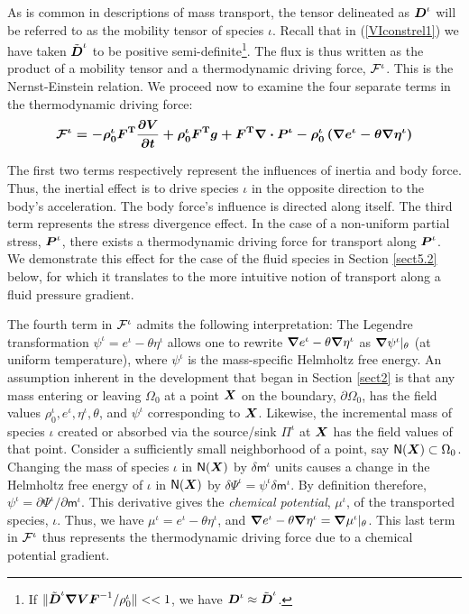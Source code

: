 As is common in descriptions of mass transport, the tensor
delineated as $\mbox{\boldmath$ D$}^\iota$ will be referred to as the mobility
tensor of species $\iota$. Recall that in (\ref{VIconstrel1}) we
have taken $\tilde{\mbox{\boldmath$ D$}}^\iota$ to be positive
semi-definite\footnote{If
$\Vert\tilde{\mbox{\boldmath$ D$}}^\iota\mbox{\boldmath$\nabla$}\mbox{\boldmath$ V$}\mbox{\boldmath$ F$}^{-1}/\rho^\iota_0\Vert << 1$,
we have $\mbox{\boldmath$ D$}^\iota \approx \tilde{\mbox{\boldmath$ D$}}^\iota$.}. The flux is thus
written as the product of a mobility tensor and a thermodynamic
driving force, $\boldmath{{\mathcal F}}^\iota$. This is the Nernst-Einstein
relation. We proceed now to examine the four separate terms in the
thermodynamic driving force:
\begin{equation}
\boldmath{{\mathcal F}}^\iota =
-\rho^\iota_0\mbox{\boldmath$ F$}^\mathrm{T}\frac{\partial\mbox{\boldmath$ V$}}{\partial t} +
\rho_0^\iota\mbox{\boldmath$ F$}^\mathrm{T}\mbox{\boldmath$ g$} +
\mbox{\boldmath$ F$}^\mathrm{T}\mbox{\boldmath$\nabla$}\cdot\mbox{\boldmath$ P$}^\iota - \rho^\iota_0\left(\mbox{\boldmath$\nabla$}
e^\iota - \theta\mbox{\boldmath$\nabla$}\eta^\iota\right) \label{drivingforceI}
\end{equation}

\noindent The first two terms respectively represent the
influences of inertia and body force. Thus, the inertial effect is
to drive species $\iota$ in the opposite direction to the body's
acceleration. The body force's influence is directed along itself.
The third term represents the stress divergence effect. In the
case of a non-uniform partial stress, $\mbox{\boldmath$ P$}^\iota$, there exists a
thermodynamic driving force for transport along $\mbox{\boldmath$ P$}^\iota$. We
demonstrate this effect for the case of the fluid species in
Section \ref{sect5.2} below, for which it translates to the more
intuitive notion of transport along a fluid pressure gradient.

The fourth term in $\boldmath{{\mathcal F}}^\iota$ admits the following
interpretation: The Legendre transformation $\psi^\iota = e^\iota
- \theta\eta^\iota$ allows one to rewrite $\mbox{\boldmath$\nabla$} e^\iota -
\theta\mbox{\boldmath$\nabla$}\eta^\iota$ as $\mbox{\boldmath$\nabla$}\psi^\iota\vert_\theta$ (at
uniform temperature), where $\psi^\iota$ is the mass-specific
Helmholtz free energy. An assumption inherent in the development
that began in Section \ref{sect2} is that any mass entering or
leaving $\Omega_0$ at a point $\mbox{\boldmath$ X$}$ on the boundary,
$\partial\Omega_0$, has the field values
$\rho_0^\iota,e^\iota,\eta^\iota,\theta$, and $\psi^\iota$
corresponding to $\mbox{\boldmath$ X$}$. Likewise, the incremental mass of species
$\iota$ created or absorbed via the source/sink $\Pi^\iota$ at
$\mbox{\boldmath$ X$}$ has the field values of that point. Consider a sufficiently
small neighborhood of a point, say
$\mathsf{N}(\mbox{\boldmath$ X$})\subset\Omega_0$. Changing the mass of species
$\iota$ in $\mathsf{N}(\mbox{\boldmath$ X$})$ by $\delta\mathsf{m}^\iota$ units
causes a change in the Helmholtz free energy of $\iota$ in
$\mathsf{N}(\mbox{\boldmath$ X$})$ by $\delta\Psi^\iota =
\psi^\iota\delta\mathsf{m}^\iota$. By definition therefore,
$\psi^\iota =
\partial\Psi^\iota/\partial\mathsf{m}^\iota$. This derivative gives the \emph{chemical
potential}, $\mu^\iota$, of the transported species, $\iota$.
Thus, we have $\mu^\iota = e^\iota - \theta\eta^\iota$, and
$\mbox{\boldmath$\nabla$} e^\iota -\theta\mbox{\boldmath$\nabla$}\eta^\iota =
\mbox{\boldmath$\nabla$}\mu^\iota\vert_\theta$. This last term in
${\boldmath{{\mathcal F}}}^\iota$ thus represents the thermodynamic driving
force due to a chemical potential gradient.

